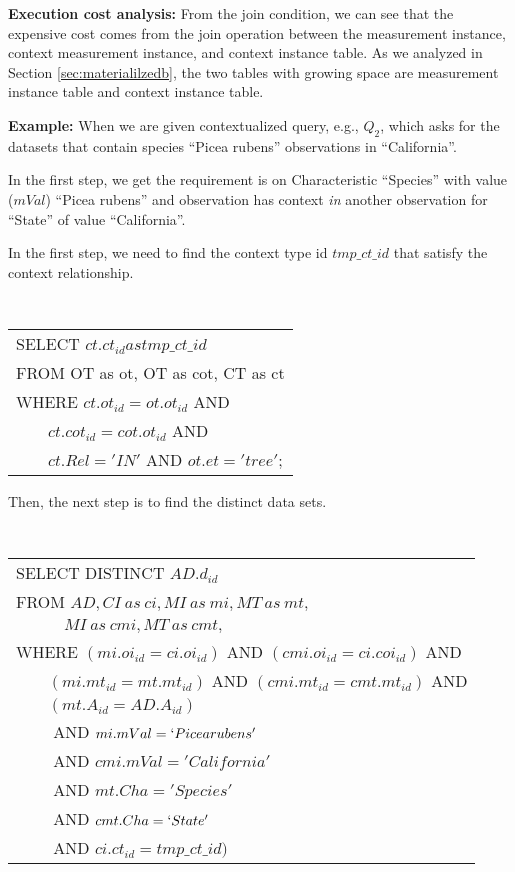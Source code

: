 {\bf Execution cost analysis:} From the join condition, we can see that the expensive cost comes from
the join operation between the measurement instance, context
measurement instance, and context instance table.
As we analyzed in Section \ref{sec:materialilzedb}, the two tables with
growing space are measurement instance table and context instance
table.

{\bf Example:} When we are given contextualized query, e.g., $Q_2$, which asks for
the datasets that contain species ``Picea rubens'' observations in
``California''.

In the first step, we get the requirement is on Characteristic
``Species'' with value ($mVal$) ``Picea rubens'' and observation has context {\em in}
another observation for ``State'' of value ``California''.



In the first step, we need to find the context type id $tmp\_ct\_id$
that satisfy the context relationship.

{\tt
\begin{tabular}{l}
SELECT $ct.ct_{id} as tmp\_ct\_id$\\
FROM OT as ot, OT as cot, CT as ct\\
WHERE $ct.ot_{id} = ot.ot_{id}$ AND \\
      $\qquad ct.cot_{id}= cot.ot_{id}$ AND \\
      $\qquad ct.Rel='IN'$ AND $ot.et='tree'$;
\end{tabular}
}

Then, the next step is to find the distinct data sets.

\vspace{0.1in}
{\tt
\begin{tabular}{l}
SELECT DISTINCT $AD.d_{id}$\\
FROM $AD, CI~as~ci, MI~as~mi, MT~as~mt,$ \\
$\quad\qquad MI~as~cmi, MT~as~cmt,$ \\
WHERE $(mi.oi_{id}=ci.oi_{id})$ AND $(cmi.oi_{id}=ci.coi_{id})$ AND\\
$\qquad (mi.mt_{id}=mt.mt_{id})$ AND $(cmi.mt_{id}=cmt.mt_{id})$ AND\\
$\qquad (mt.A_{id}=AD.A_{id})$\\
$\qquad$ AND $mi.mVal=`Picea rubens'$ \\
$\qquad$ AND $cmi.mVal='California'$\\
$\qquad$ AND $mt.Cha = 'Species'$\\
$\qquad$ AND $cmt.Cha=`State'$\\
$\qquad$ AND $ci.ct_{id} = tmp\_ct\_id)$\\
\end{tabular}
}
\vspace{0.1in}


